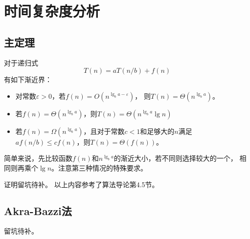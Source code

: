 \section{时间复杂度分析}
\subsection{主定理}
\begin{theorem}
    对于递归式
    \begin{displaymath}
        T(n)=aT(n/b)+f(n)
    \end{displaymath}
    有如下渐近界：
    \begin{itemize}
        \item 对常数$\varepsilon>0$，若$f(n)=O(n^{\lg_b{a-\varepsilon}})$，
        则$T(n)=\Theta(n^{\lg_ba})$。
        \item 若$f(n)=\Theta(n^{\lg_ba})$，则$T(n)=\Theta(n^{\lg_ba}\lg n)$
        \item 若$f(n)=\Omega(n^{\lg_ba})$，且对于常数$c<1$和足够大的$n$满足
        $af(n/b)\leq cf(n)$，则$T(n)=\Theta(f(n))$。
    \end{itemize}
\end{theorem}
简单来说，先比较函数$f(n)$和$n^{\lg_ba}$的渐近大小，若不同则选择较大的一个，
相同则再乘个$\lg n$。注意第三种情况的特殊要求。

证明留坑待补。
以上内容参考了算法导论\cite{ITA3}第4.5节。
\subsection{Akra-Bazzi法}
留坑待补。
